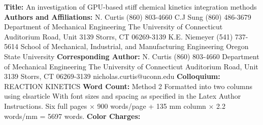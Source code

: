 \documentclass[preprint]{elsarticle}
\begin{document}
\begin{titlepage}
\parbox{\linewidth}{
\begin{flushleft}
\textbf{Title:}\linebreak
An investigation of GPU-based stiff chemical kinetics integration methods
\linebreak
\linebreak
\textbf{Authors and Affiliations:} \linebreak\linebreak
  N.  Curtis	(860) 803-4660 \linebreak
  C.J Sung	(860) 486-3679 \linebreak
  Department of Mechanical Engineering \linebreak
  The University of Connecticut  Auditorium Road, Unit 3139 \linebreak
  Storrs, CT 06269-3139 \linebreak
  \linebreak
  K.E. Niemeyer	(541) 737-5614 \linebreak
  School of Mechanical, Industrial, and Manufacturing Engineering\linebreak
  Oregon State University\linebreak
\linebreak
\textbf{Corresponding Author:}\linebreak
  N. Curtis\linebreak
  (860) 803-4660 \linebreak
  Department of Mechanical Engineering\linebreak
  The University of Connecticut  Auditorium Road, Unit 3139 \linebreak
  Storrs, CT 06269-3139 \linebreak
  nicholas.curtis@uconn.edu\linebreak
\linebreak
\textbf{Colloquium:}\linebreak
REACTION KINETICS\linebreak
\linebreak
\textbf{Word Count:}\linebreak
Method 2\linebreak
Formatted into two columns using elsarticle\linebreak
With font sizes and spacing as specified in the Latex Author Instructions.\linebreak
Six full pages $\times$ 900 words/page + 135 mm column $\times$ 2.2 words/mm = 5697 words.\linebreak
\textbf{Color Charges:}\linebreak
{}
\end{flushleft}
}
\end{titlepage}
\end{document}
